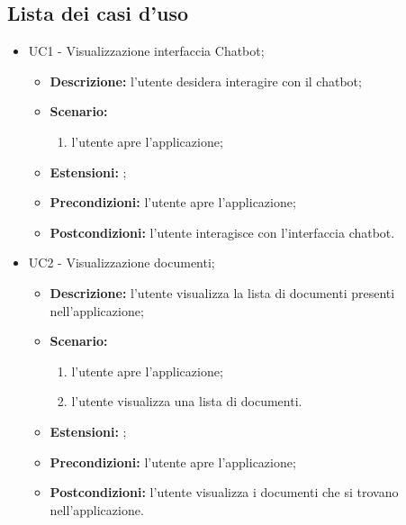 \documentclass[10pt, a4paper]{article}
\begin{document}
\subsection{Lista dei casi d'uso}
\begin{itemize}

    \item UC1 - Visualizzazione interfaccia Chatbot;
    \begin{itemize}
        \item \textbf{Descrizione:} l'utente desidera interagire con il chatbot;
        \item \textbf{Scenario: } 
        \begin{enumerate}[label={\arabic*.}, align=left]
        \item l'utente apre l'applicazione;
        \end{enumerate}
        \item \textbf{Estensioni: };
        \item \textbf{Precondizioni:} l'utente apre l'applicazione;
        \item \textbf{Postcondizioni:} l'utente interagisce con l'interfaccia chatbot.\\
    \end{itemize}
    
    \item UC2 - Visualizzazione documenti;
    \begin{itemize}
        \item \textbf{Descrizione:} l'utente visualizza la lista di documenti presenti nell'applicazione;
        \item \textbf{Scenario: }
        \begin{enumerate}[label={\arabic*.}, align=left]
        \item l'utente apre l'applicazione;
        \item l'utente visualizza una lista di documenti.
        \end{enumerate}
        \item \textbf{Estensioni: };
        \item \textbf{Precondizioni:} l'utente apre l'applicazione;
        \item \textbf{Postcondizioni:} l'utente visualizza i documenti che si trovano nell'applicazione.\\
    \end{itemize}
    

\end{itemize}
\end{document}
